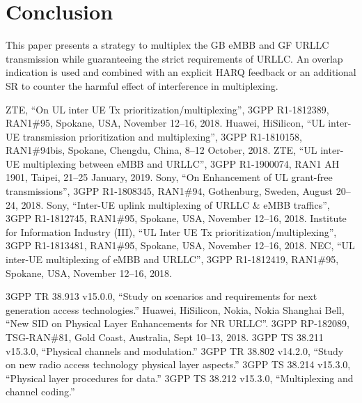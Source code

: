 \documentclass[conference]{IEEEtran}
\begin{document}
\section{Conclusion}\label{IV}

This paper presents a strategy to multiplex the GB eMBB and GF URLLC transmission while guaranteeing the strict requirements of URLLC. An overlap indication is used and combined with an explicit HARQ feedback or an additional SR to counter the harmful effect of interference in  multiplexing.

\begin{thebibliography}{00}

  ZTE, ``On UL inter UE Tx prioritization/multiplexing'', 3GPP R1-1812389, RAN1\#95, Spokane, USA, November 12--16, 2018.
 Huawei, HiSilicon, ``UL inter-UE transmission prioritization and multiplexing'', 3GPP R1-1810158, RAN1\#94bis, Spokane, Chengdu, China, 8--12 October, 2018.
 ZTE, ``UL inter-UE multiplexing between eMBB and URLLC'', 3GPP R1-1900074, RAN1 AH 1901, Taipei,  21--25 January, 2019.
 Sony, ``On Enhancement of UL grant-free transmissions'', 3GPP R1-1808345, RAN1\#94, Gothenburg, Sweden, August 20--24, 2018.
  Sony, ``Inter-UE uplink multiplexing of URLLC \& eMBB traffics'', 3GPP R1-1812745, RAN1\#95, Spokane, USA, November 12--16, 2018.
  Institute for Information Industry (III), ``UL Inter UE Tx prioritization/multiplexing'', 3GPP R1-1813481, RAN1\#95, Spokane, USA, November 12--16, 2018.
  NEC, ``UL inter-UE multiplexing of eMBB and URLLC'', 3GPP R1-1812419, RAN1\#95, Spokane, USA, November 12--16, 2018.

 3GPP TR 38.913 v15.0.0, ``Study on scenarios and requirements for next generation access technologies.''
 Huawei, HiSilicon, Nokia, Nokia Shanghai Bell, ``New SID on Physical Layer Enhancements for NR URLLC''. 3GPP RP-182089, TSG-RAN\#81, Gold Coast, Australia, Sept 10--13, 2018.
 3GPP TS 38.211 v15.3.0, ``Physical channels and modulation.''
 3GPP TR 38.802 v14.2.0, ``Study on new radio access technology physical layer aspects.''
 3GPP TS 38.214 v15.3.0, ``Physical layer procedures for data.''
 3GPP TS 38.212 v15.3.0, ``Multiplexing and channel coding.''

\end{thebibliography}
\vspace{12pt}
\end{document}
